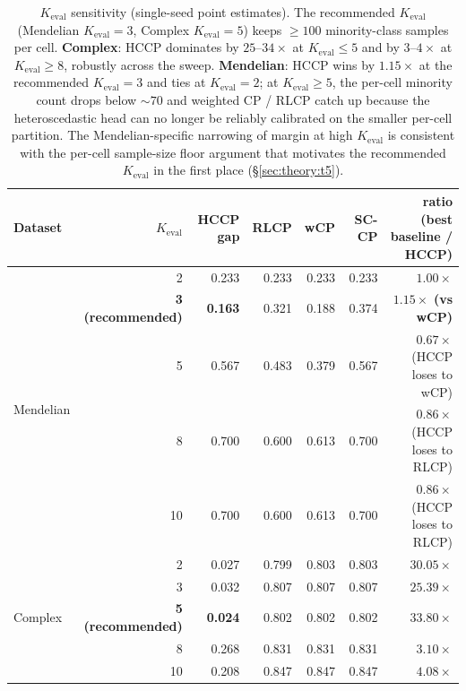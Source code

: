 \begin{table}[h]
\centering
\small
\caption{$K_{\mathrm{eval}}$ sensitivity (single-seed point estimates). The recommended $K_{\mathrm{eval}}$ (Mendelian $K_{\mathrm{eval}} = 3$, Complex $K_{\mathrm{eval}} = 5$) keeps $\geq 100$ minority-class samples per cell. \textbf{Complex}: HCCP dominates by $25$–$34\times$ at $K_{\mathrm{eval}} \leq 5$ and by $3$–$4\times$ at $K_{\mathrm{eval}} \geq 8$, robustly across the sweep. \textbf{Mendelian}: HCCP wins by $1.15\times$ at the recommended $K_{\mathrm{eval}} = 3$ and ties at $K_{\mathrm{eval}} = 2$; at $K_{\mathrm{eval}} \geq 5$, the per-cell minority count drops below $\sim 70$ and weighted CP / RLCP catch up because the heteroscedastic head can no longer be reliably calibrated on the smaller per-cell partition. The Mendelian-specific narrowing of margin at high $K_{\mathrm{eval}}$ is consistent with the per-cell sample-size floor argument that motivates the recommended $K_{\mathrm{eval}}$ in the first place (§\ref{sec:theory:t5}).}
\label{tab:keval_sensitivity}
\setlength{\tabcolsep}{4pt}
\begin{tabular}{lrrrrrr}
\toprule
Dataset & $K_{\mathrm{eval}}$ & HCCP gap & RLCP & wCP & SC-CP & ratio (best baseline / HCCP) \\
\midrule
\multirow{5}{*}{Mendelian}
 & 2  & 0.233 & 0.233 & 0.233 & 0.233 & $1.00\times$ \\
 & \textbf{3 (recommended)} & \textbf{0.163} & 0.321 & 0.188 & 0.374 & $\mathbf{1.15\times}$ \textbf{(vs wCP)} \\
 & 5  & 0.567 & 0.483 & 0.379 & 0.567 & $0.67\times$ (HCCP loses to wCP) \\
 & 8  & 0.700 & 0.600 & 0.613 & 0.700 & $0.86\times$ (HCCP loses to RLCP) \\
 & 10 & 0.700 & 0.600 & 0.613 & 0.700 & $0.86\times$ (HCCP loses to RLCP) \\
\midrule
\multirow{5}{*}{Complex}
 & 2  & 0.027 & 0.799 & 0.803 & 0.803 & $30.05\times$ \\
 & 3  & 0.032 & 0.807 & 0.807 & 0.807 & $25.39\times$ \\
 & \textbf{5 (recommended)} & \textbf{0.024} & 0.802 & 0.802 & 0.802 & $\mathbf{33.80\times}$ \\
 & 8  & 0.268 & 0.831 & 0.831 & 0.831 & $3.10\times$ \\
 & 10 & 0.208 & 0.847 & 0.847 & 0.847 & $4.08\times$ \\
\bottomrule
\end{tabular}
\end{table}

